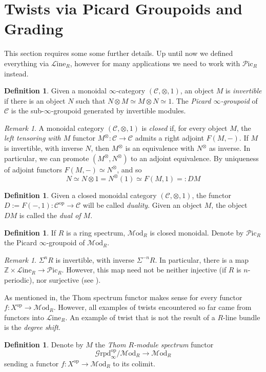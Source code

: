 \documentclass[a4paper]{book}
\newcommand{\lC}{\mathcal{C}}
\newcommand{\lG}{\mathcal{G}}
\newcommand{\lL}{\mathcal{L}}
\newcommand{\lM}{\mathcal{M}}
\newcommand{\lP}{\mathcal{P}}
\newcommand{\bZ}{\mathbb{Z}}
\newcommand{\op}{\mathrm{op}}
\newcommand{\Grpd}{\lG\mathrm{rpd}} %
\renewcommand{\Line}{\lL\mathrm{ine}} %
\newcommand{\Mod}{\lM\mathrm{od}} %
\newcommand{\Pic}{\lP\mathrm{ic}} %
\theoremstyle{definition}
\newtheorem{definition}[equation]{Definition}
\theoremstyle{remark}
\newtheorem{remark}[equation]{Remark}
\numberwithin{equation}{section}
\begin{document}
\section{Twists via Picard Groupoids and Grading}
This section requires some some further details. Up until now we defined everything via $\Line_R$, however for many applications we need to work with $\Pic_R$ instead.
\begin{definition}
	Given a monoidal $\infty$-category $(\lC,\otimes,1)$, an object $M$ is \emph{invertible} if there is an object $N$ such that $N\otimes M\simeq M\otimes N\simeq 1$. The \emph{Picard $\infty$-groupoid} of $\lC$ is the sub-$\infty$-groupoid generated by invertible modules. 
\end{definition}
\begin{remark}\label{rmk:dualinver}
	A monoidal category $(\lC,\otimes,1)$ is \emph{closed} if, for every object $M$, the \emph{left tensoring with $M$} functor $M^\otimes:\lC\to\lC$ admits a right adjoint $F(M,-)$. If $M$ is invertible, with inverse $N$, then $M^\otimes$ is an equivalence with $N^\otimes$ as inverse. In particular, we can promote $(M^\otimes,N^\otimes)$ to an adjoint equivalence. By uniqueness of adjoint functors $F(M,-)\simeq N^\otimes$, and so \[N\simeq N\otimes1= N^\otimes(1)\simeq F(M,1)=:DM\] 
\end{remark}
\begin{definition}
	Given a closed monoidal category $(\lC,\otimes,1)$, the functor $D:=F(-,1):\lC^{\op}\to\lC$ will be called \emph{duality}. Given an object $M$, the object $DM$ is called the \emph{dual of $M$}. 
\end{definition}
\begin{definition}
If $R$ is a ring spectrum, $\Mod_R$ is closed monoidal. Denote by $\Pic_R$ the Picard $\infty$-groupoid of $\Mod_R$. 
\end{definition}
\begin{remark}
	$\Sigma^nR$ is invertible, with inverse $\Sigma^{-n}R$. In particular, there is a map $\bZ\times\Line_R\to\Pic_R$. However, this map need not be neither injective (if $R$ is $n$-periodic), nor surjective (see \cite{hill2011tmf}). 
\end{remark}
As mentioned in, the Thom spectrum functor makes sense for every functor $f:X^{\op}\to\Mod_R$. However, all examples of twists encountered so far came from functors into $\Line_R$. An example of twist that is not the result of a $R$-line bundle is the \emph{degree shift}. 
\begin{definition}
	Denote by $M$ the \emph{Thom $R$-module spectrum} functor \[\Grpd^{\op}_\infty/\Mod_R\to\Mod_R\]sending a functor $f:X^{\op}\to\Mod_R$ to its colimit.  
\end{definition}
\end{document}
